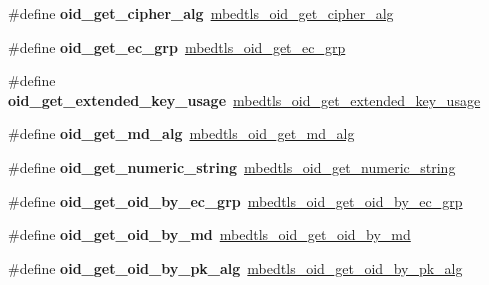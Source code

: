 \begin{DoxyCompactItemize}
\mbox{\label{compat-1_83_8h_a0762820f6ff18a506a2b30971bbb3e3c}} 
\#define {\bfseries oid\+\_\+get\+\_\+cipher\+\_\+alg}~\mbox{\hyperlink{oid_8h_a16d0ae3b5c5c1a81774677c5c7a9fb97}{mbedtls\+\_\+oid\+\_\+get\+\_\+cipher\+\_\+alg}}
\item 
\mbox{\label{compat-1_83_8h_a669c6e94fe5c3f49f633e766d70a1b16}} 
\#define {\bfseries oid\+\_\+get\+\_\+ec\+\_\+grp}~\mbox{\hyperlink{oid_8h_a8c9b600e709bcd6c9bd455db3fb37853}{mbedtls\+\_\+oid\+\_\+get\+\_\+ec\+\_\+grp}}
\item 
\mbox{\label{compat-1_83_8h_a692ace1a7556bd14731c5706d27c8434}} 
\#define {\bfseries oid\+\_\+get\+\_\+extended\+\_\+key\+\_\+usage}~\mbox{\hyperlink{oid_8h_a5f8ddcd81a3857571001628d3410bb68}{mbedtls\+\_\+oid\+\_\+get\+\_\+extended\+\_\+key\+\_\+usage}}
\item 
\mbox{\label{compat-1_83_8h_adf24ab07a1a5897d5eadb1cfe9686f13}} 
\#define {\bfseries oid\+\_\+get\+\_\+md\+\_\+alg}~\mbox{\hyperlink{oid_8h_ad17c5466d99de2ea8a9c581ecdfbded1}{mbedtls\+\_\+oid\+\_\+get\+\_\+md\+\_\+alg}}
\item 
\mbox{\label{compat-1_83_8h_ad30b7ebf01955033e70d02a1290c63f2}} 
\#define {\bfseries oid\+\_\+get\+\_\+numeric\+\_\+string}~\mbox{\hyperlink{oid_8h_afdf526c6529dce3f967ed018f28bed07}{mbedtls\+\_\+oid\+\_\+get\+\_\+numeric\+\_\+string}}
\item 
\mbox{\label{compat-1_83_8h_ac3469cf224d052ae4983fa070d59edc4}} 
\#define {\bfseries oid\+\_\+get\+\_\+oid\+\_\+by\+\_\+ec\+\_\+grp}~\mbox{\hyperlink{oid_8h_aa656ad80bf8df19cdc990c0c6efe66eb}{mbedtls\+\_\+oid\+\_\+get\+\_\+oid\+\_\+by\+\_\+ec\+\_\+grp}}
\item 
\mbox{\label{compat-1_83_8h_a22a03afd70eda5d23032143ff2acada7}} 
\#define {\bfseries oid\+\_\+get\+\_\+oid\+\_\+by\+\_\+md}~\mbox{\hyperlink{oid_8h_a776c43adb7d25f3cae1b4ab48a70ee5b}{mbedtls\+\_\+oid\+\_\+get\+\_\+oid\+\_\+by\+\_\+md}}
\item 
\mbox{\label{compat-1_83_8h_a1938557f1303ad2bd9d796647d62f1da}} 
\#define {\bfseries oid\+\_\+get\+\_\+oid\+\_\+by\+\_\+pk\+\_\+alg}~\mbox{\hyperlink{oid_8h_af64b657d5ecb14c7035bf5ecf88d4458}{mbedtls\+\_\+oid\+\_\+get\+\_\+oid\+\_\+by\+\_\+pk\+\_\+alg}}

\end{DoxyCompactItemize}
